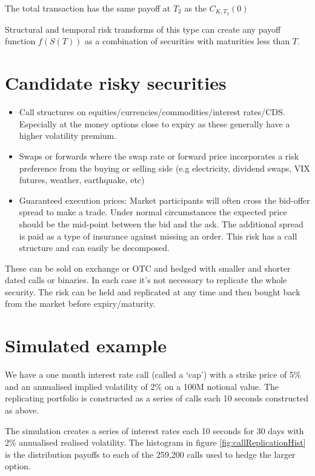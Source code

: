 \documentclass{tran-l}
\theoremstyle{definition}
\theoremstyle{remark}
\numberwithin{equation}{subsection}
\begin{document}
The total transaction has the same payoff at $T_2$ as the $C_{K,T_2}(0)$

Structural and temporal risk transforms of this type can create any payoff function $f(S(T))$ as a combination of securities with maturities less than $T$.

\section*{Candidate risky securities}

\begin{itemize}
\item Call structures on equities/currencies/commodities/interest rates/CDS. Especially at the money options close to expiry as these generally have a higher volatility premium.
\item Swaps or forwards where the swap rate or forward price incorporates a risk preference from the buying or selling side (e.g electricity, dividend swaps, VIX futures, weather, earthquake, etc)
\item Guaranteed execution prices: Market participants will often cross the bid-offer spread to make a trade. Under normal circumstances the expected price should be the mid-point between the bid and the ask. The additional spread is paid as a type of insurance against missing an order. This risk has a call structure  and can easily be decomposed.
\end{itemize}

These can be sold on exchange or OTC and hedged with smaller and shorter dated calls or binaries. In each case it's not necessary to replicate the whole security. The risk can be held and replicated at any time and then bought back from the market before expiry/maturity.

\section*{Simulated example}

We have a one month interest rate call (called a `cap') with a strike price of 5\% and an annualised implied volatility of 2\% on a 100M notional value. The replicating portfolio is constructed as a series of calls each 10 seconds constructed as above.

The simulation creates a series of interest rates each 10 seconds for 30 days with 2\% annualised realised volatility. The histogram in figure \ref{fig:callReplicationHist} is the distribution payoffs to each of the 259,200 calls used to hedge the larger option.
\end{document}
